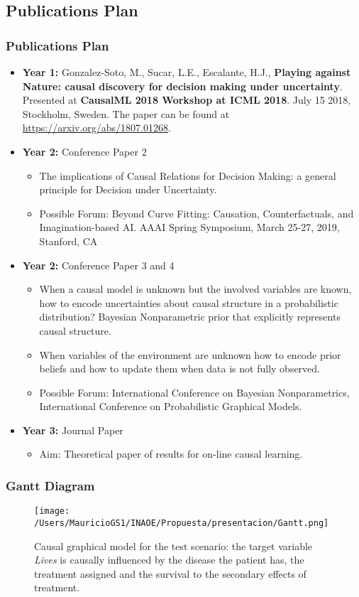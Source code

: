 \documentclass{beamer}
\theoremstyle{plain}
\begin{document}
\subsection{Publications Plan}
\begin{frame}
\frametitle{Publications Plan}
\begin{itemize}
\item \textbf{Year 1:} Gonzalez-Soto, M., Sucar, L.E., Escalante, H.J., \textbf{Playing against Nature: causal discovery for decision making under uncertainty}. Presented at \textbf{CausalML 2018 Workshop at ICML 2018}. July 15 2018, Stockholm, Sweden. The paper can be found at \url{https://arxiv.org/abs/1807.01268}.
\item \textbf{Year 2:} Conference Paper 2 
		\begin{itemize}
		\item The implications of Causal Relations for Decision Making: a general principle for Decision under Uncertainty.
		\item Possible Forum: Beyond Curve Fitting: Causation, Counterfactuals, and Imagination-based AI. AAAI Spring Symposium, March 25-27, 2019, Stanford, CA
		\end{itemize}
\item \textbf{Year 2:} Conference Paper 3 and 4
	\begin{itemize}
	\item When a causal model is unknown but the involved variables are known, how to encode uncertainties about causal structure in a probabilistic distribution? Bayesian Nonparametric prior that explicitly represents causal structure.
	\item When variables of the environment are unknown how to encode prior beliefs and how to update them when data is not fully observed.
	\item Possible Forum: International Conference on Bayesian Nonparametrics, International Conference on Probabilistic Graphical Models.
	\end{itemize}
\item \textbf{Year 3:} Journal Paper
		\begin{itemize}
			\item Aim: Theoretical paper of results for on-line causal learning.
		\end{itemize}
\end{itemize}
\end{frame}

\begin{frame}
\frametitle{Gantt Diagram}
\begin{figure}[ht]
\vskip 0.2in
\begin{center}
\texttt{[image: /Users/MauricioGS1/INAOE/Propuesta/presentacion/Gantt.png]}
\caption{Causal graphical model for the test scenario: the target variable \textit{Lives} is causally influenced by the disease the patient has, the treatment assigned and the survival to the secondary effects of treatment.}
\label{causal_model}
\end{center}
\vskip -0.2in
\end{figure}
\end{frame}
\end{document}
